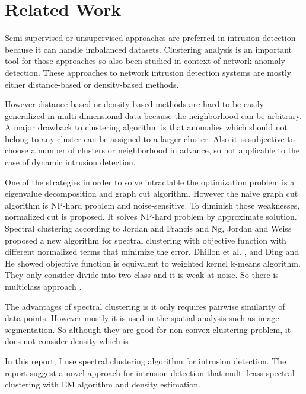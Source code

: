 \section{Related Work}
Semi-supervised or unsupervised approaches are preferred in intrusion detection\cite{chandola09} because it can handle imbalanced datasets.
Clustering analysis is an important tool for those approaches so also been studied in context of network anomaly detection. 
These approaches to network intrusion detection systems are mostly either distance-based\cite{knorr00}\cite{ramaswamy00} or density-based methods\cite{breuning00}\cite{aggarwal01}. 

However distance-based or density-based methods are hard to be easily generalized in multi-dimensional data because the neighborhood can be arbitrary. 
A major drawback to clustering algorithm is that anomalies which should not belong to any cluster can be assigned to a larger cluster. 
Also it is subjective to choose a number of clusters or neighborhood in advance, so not applicable to the case of dynamic intrusion detection. 

One of the strategies in order to solve intractable the optimization problem is a eigenvalue decomposition and graph cut algorithm. 
However the naive graph cut algorithm is NP-hard problem and noise-sensitive. 
To diminish those weaknesses, normalized cut\cite{jianbo00} is proposed. 
It solves NP-hard problem by approximate solution.
Spectral clustering according to Jordan and Francis \cite{jordan04} and Ng, Jordan and Weiss \cite{ng01} proposed a new algorithm for spectral clustering with objective function with different normalized terms that minimize the error.
Dhillon et al. \cite{dhillon04}, and Ding and He \cite{cding04} showed objective function is equivalent to weighted kernel k-means algorithm.
They only consider divide into two class and it is weak at noise. 
So there is multiclass approach \cite{jianbo03}. 

The advantages of spectral clustering is it only requires pairwise similarity of data points. 
However mostly it is used in the spatial analysis such as image segmentation. 
So although they are good for non-convex clustering problem, it does not consider density which is 

In this report, I use spectral clustering algorithm for intrusion detection. 
The report suggest a novel approach for intrusion detection that multi-lcass spectral clustering with EM algorithm and density estimation. 
